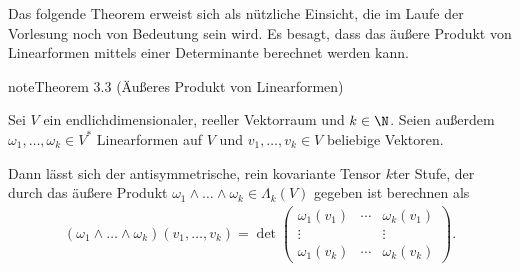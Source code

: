 \documentclass[letterpaper,10pt,english]{jupyterBook}
\begin{document}
\sphinxAtStartPar
Das folgende Theorem erweist sich als nützliche Einsicht, die im Laufe der Vorlesung noch von Bedeutung sein wird.
Es besagt, dass das äußere Produkt von Linearformen mittels einer Determinante berechnet werden kann.
\label{vektoranalysis/tensor:theorem-37}
\begin{sphinxadmonition}{note}{Theorem 3.3 (Äußeres Produkt von Linearformen)}



\sphinxAtStartPar
Sei \(V\) ein endlich\sphinxhyphen{}dimensionaler, reeller Vektorraum und \(k \in \N\).
Seien außerdem \(\omega_1, \ldots, \omega_k \in V^\ast\) Linearformen auf \(V\) und \(v_1, \ldots, v_k \in V\) beliebige Vektoren.

\sphinxAtStartPar
Dann lässt sich der antisymmetrische, rein kovariante Tensor \(k\)\sphinxhyphen{}ter Stufe, der durch das äußere Produkt \(\omega_1 \wedge \ldots \wedge \omega_k \in \Lambda_k(V)\) gegeben ist berechnen als
\begin{equation*}
\begin{split}(\omega_1 \wedge \ldots \wedge \omega_k)(v_1, \ldots, v_k) = \operatorname{det}
\begin{pmatrix}
\omega_1(v_1) & \cdots & \omega_k(v_1)\\
\vdots & & \vdots \\
\omega_1(v_k) & \cdots & \omega_k(v_k)
\end{pmatrix}.\end{split}
\end{equation*}\end{sphinxadmonition}
\end{document}

